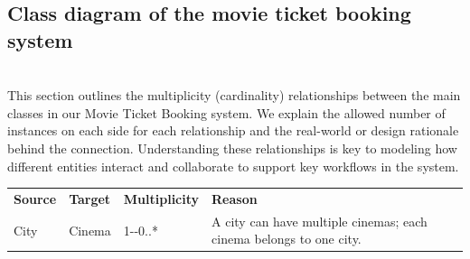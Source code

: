 \subsection{Class diagram of the movie ticket booking system}\label{QAMjWracLi1asAe3N6htr}
\\
This section outlines the multiplicity (cardinality) relationships between the main classes in our Movie Ticket Booking system. We explain the allowed number of instances on each side for each relationship and the real-world or design rationale behind the connection. Understanding these relationships is key to modeling how different entities interact and collaborate to support key workflows in the system.

\begin{center}
{\def\LTcaptype{none} %
\begin{longtable}[]{@{}
>{\raggedright\arraybackslash} p{}
>{\raggedright\arraybackslash} p{}
>{\raggedright\arraybackslash} p{}
>{\raggedright\arraybackslash} p{}@{}}
\toprule\noalign{}
\endhead
\bottomrule\noalign{}
\endlastfoot
\begin{minipage}[t]{\linewidth}\raggedright
\textbf{Source}
\end{minipage} & \begin{minipage}[t]{\linewidth}\raggedright
\textbf{Target}
\end{minipage} & \begin{minipage}[t]{\linewidth}\raggedright
\textbf{Multiplicity}
\end{minipage} & \begin{minipage}[t]{\linewidth}\raggedright
\textbf{Reason}
\end{minipage} \\
\begin{minipage}[t]{\linewidth}\raggedright
City
\end{minipage} & \begin{minipage}[t]{\linewidth}\raggedright
Cinema
\end{minipage} & \begin{minipage}[t]{\linewidth}\raggedright
1-\/-0..*
\end{minipage} & \begin{minipage}[t]{\linewidth}\raggedright
A city can have multiple cinemas; each cinema belongs to one city.
\end{minipage} \\

\end{longtable}}
\end{center}
